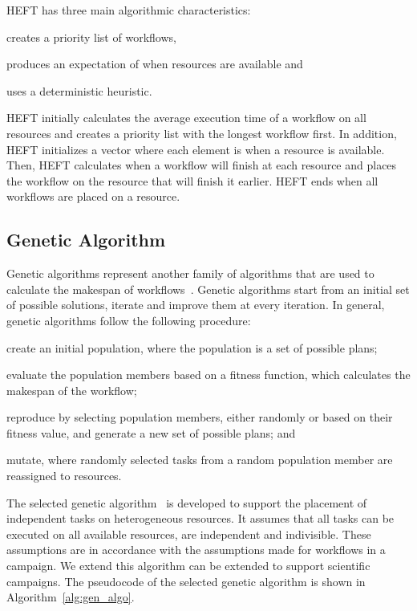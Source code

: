 HEFT has three main algorithmic characteristics:
\begin{inparaenum}[1)]
    \item creates a priority list of workflows,
    \item produces an expectation of when resources are available and
    \item uses a deterministic heuristic.
\end{inparaenum}
HEFT initially calculates the average execution time of a workflow on all resources and creates a priority list with the longest workflow first.
In addition, HEFT initializes a vector where each element is when a resource is available.
Then, HEFT calculates when a workflow will finish at each resource and places the workflow on the resource that will finish it earlier.
HEFT ends when all workflows are placed on a resource.

   
\subsection{Genetic Algorithm}
\label{algo:gen}
Genetic algorithms represent another family of algorithms that are used to calculate the makespan of workflows~\cite{dong2006scheduling}.
Genetic algorithms start from an initial set of possible solutions, iterate and improve them at every iteration.
In general, genetic algorithms follow the following procedure:
\begin{inparaenum}[(i)]
    \item create an initial population, where the population is a set of possible plans;
    \item evaluate the population members based on a fitness function, which calculates the makespan of the workflow;
    \item reproduce by selecting population members, either randomly or based on their fitness value, and generate a new set of possible plans; and
    \item mutate, where randomly selected tasks from a random population member are reassigned to resources.%
\end{inparaenum}

The selected genetic algorithm~\cite{page2005algorithm} is developed to support the placement of independent tasks on heterogeneous resources.
It assumes that all tasks can be executed on all available resources, are independent and indivisible.
These assumptions are in accordance with the assumptions made for workflows in a campaign.
We extend this algorithm can be extended to support scientific campaigns.
The pseudocode of the selected genetic algorithm is shown in Algorithm~\ref{alg:gen_algo}.

